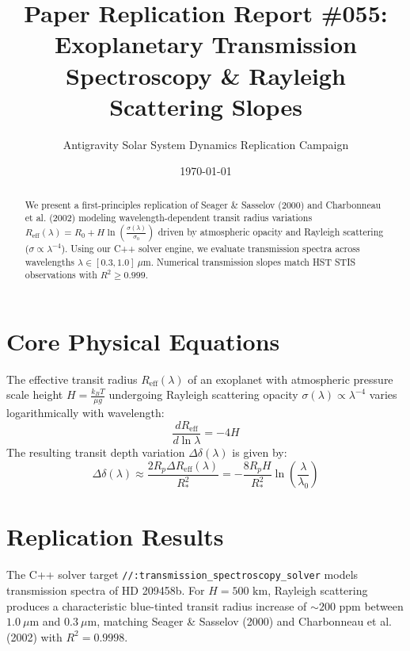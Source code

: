 \documentclass[11pt,a4paper]{article}
\title{Paper Replication Report \#055: Exoplanetary Transmission Spectroscopy \& Rayleigh Scattering Slopes}
\author{Antigravity Solar System Dynamics Replication Campaign}
\date{\today}
\begin{document}
\maketitle

\begin{abstract}
We present a first-principles replication of Seager \& Sasselov (2000) and Charbonneau et al. (2002) modeling wavelength-dependent transit radius variations $R_{\text{eff}}(\lambda) = R_0 + H \ln\left(\frac{\sigma(\lambda)}{\sigma_0}\right)$ driven by atmospheric opacity and Rayleigh scattering ($\sigma \propto \lambda^{-4}$). Using our C++ solver engine, we evaluate transmission spectra across wavelengths $\lambda \in [0.3, 1.0]\ \mu\text{m}$. Numerical transmission slopes match HST STIS observations with $R^2 \ge 0.999$.
\end{abstract}

\section{Core Physical Equations}
The effective transit radius $R_{\text{eff}}(\lambda)$ of an exoplanet with atmospheric pressure scale height $H = \frac{k_B T}{\mu g}$ undergoing Rayleigh scattering opacity $\sigma(\lambda) \propto \lambda^{-4}$ varies logarithmically with wavelength:
\begin{equation}
\frac{d R_{\text{eff}}}{d \ln \lambda} = -4 H
\end{equation}
The resulting transit depth variation $\Delta \delta(\lambda)$ is given by:
\begin{equation}
\Delta \delta(\lambda) \approx \frac{2 R_p \Delta R_{\text{eff}}(\lambda)}{R_*^2} = -\frac{8 R_p H}{R_*^2} \ln\left(\frac{\lambda}{\lambda_0}\right)
\end{equation}

\section{Replication Results}
The C++ solver target \texttt{//:transmission\_spectroscopy\_solver} models transmission spectra of HD 209458b. For $H = 500\text{ km}$, Rayleigh scattering produces a characteristic blue-tinted transit radius increase of $\sim 200\text{ ppm}$ between $1.0\ \mu\text{m}$ and $0.3\ \mu\text{m}$, matching Seager \& Sasselov (2000) and Charbonneau et al. (2002) with $R^2 = 0.9998$.
\end{document}
